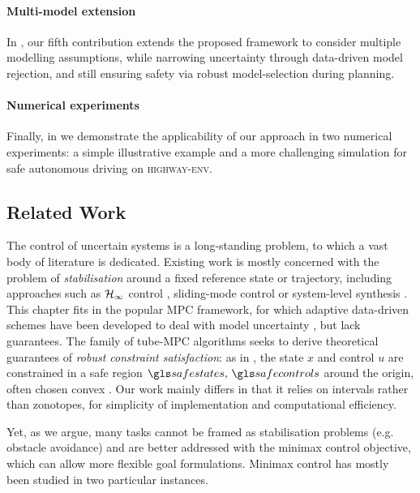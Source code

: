 \paragraph{Multi-model extension}
In \textbf{}, our fifth contribution extends the proposed framework to consider multiple modelling assumptions, while narrowing uncertainty through data-driven model rejection, and still ensuring safety via robust model-selection during planning.

\paragraph{Numerical experiments}
Finally, in \textbf{} we demonstrate the applicability of our approach in two numerical experiments: a simple illustrative example and a more challenging simulation for safe autonomous driving on \textsc{highway-env}.

\subsection{Related Work}

The control of uncertain systems is a long-standing problem, to which a vast body of literature is dedicated. Existing work is mostly concerned with the problem of \emph{stabilisation} around a fixed reference state or trajectory, including approaches such as $\mathcal{H}_\infty$ control \citep[][]{Basar1996}, sliding-mode control \citep{Lu1997} or system-level synthesis \citep{Dean2019,Dean2018}. This chapter fits in the popular \gls{MPC} framework, for which adaptive data-driven schemes have been developed to deal with model uncertainty \citep{Sastry1990,Tanaskovic2014,Amos2018}, but lack guarantees. The family of tube-MPC algorithms seeks to derive theoretical guarantees of \emph{robust constraint satisfaction}: as in , the state $x$ and control $u$ are constrained in a safe region $\safestates,\,\safecontrols$ around the origin, often chosen convex \citep{Fukushima2007,Adetola2009,Aswani2013,Turchetta2016,Lorenzen2017,Kohler2019,Lu2019}. Our work mainly differs in that it relies on intervals rather than zonotopes, for simplicity of implementation and computational efficiency.

Yet, as we argue, many tasks cannot be framed as stabilisation problems (e.g. obstacle avoidance) and are better addressed with the minimax control objective, which can allow more flexible goal formulations. Minimax control has mostly been studied in two particular instances.

